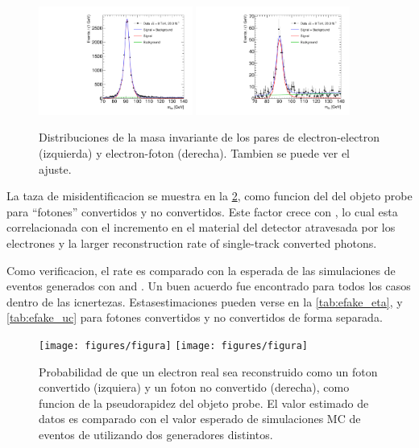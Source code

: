 \begin{figure}[h]
  \begin{center}
    \includegraphics[width=0.45\textwidth]{figures/Fit_mee_efakes_Data_all}  \hfill
    \includegraphics[width=0.45\textwidth]{figures/Fit_meg_efakes_Data_all}
    \caption{Distribuciones de la masa invariante de los pares de electron-electron (izquierda) y electron-foton (derecha).
    Tambien se puede ver el ajuste.}
    \label{fig:invmass_pairs}
  \end{center}
\end{figure}

La taza de misidentificacion se muestra en la {\fig} \ref{fig:efake_eta}, como funcion
del {\abseta} del objeto probe para ``fotones'' convertidos y no convertidos.
Este factor crece con {\abseta}, lo cual esta correlacionada con el incremento en el
material del detector atravesada por los electrones y la larger
reconstruction rate of single-track converted photons.

Como verificacion, el rate es comparado con la esperada de las simulaciones de eventos {\Zee}
generados con {\sherpa} and \powheg.
Un buen acuerdo fue encontrado para todos los casos dentro de las icnertezas. Estasestimaciones
pueden verse en la {\tab} \ref{tab:efake_eta}, y {\tab} \ref{tab:efake_uc} para fotones convertidos
y no convertidos de forma separada.

\begin{figure}[h]
  \centering
  \texttt{[image: figures/figura]}
  \texttt{[image: figures/figura]}
  \caption{Probabilidad de que un electron real sea reconstruido como un foton convertido (izquiera)
    y un foton no convertido (derecha), como funcion de la pseudorapidez del objeto probe. El valor
    estimado de datos es comparado con el valor esperado de simulaciones MC de eventos de {\Zee} utilizando
    dos generadores distintos.}
  \label{fig:efake_eta}
\end{figure}


